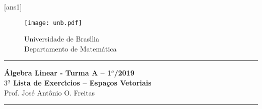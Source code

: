 \documentclass[12pt]{exam}
\newcommand{\vesp}[1]{\vspace{ #1  cm}}
\begin{document}
\pagestyle{empty}

[ans1]

\begin{figure}[h]
        \begin{minipage}[c]{1.7cm}
        \texttt{[image: unb.pdf]}
        \end{minipage}%
        \hspace{0pt}
        \begin{minipage}[c]{4in}
          {Universidade de Bras{\'\i}lia} \\
          {Departamento de Matem{\'a}tica}
\end{minipage}
\end{figure}

\vesp{-0.35} \hrule

\begin{center}
{\Large\bf \'Algebra Linear - Turma A -- 1$^{o}$/2019} \\ \vspace{9pt} {\large\bf
  $3^{\underline{a}}$ Lista de Exerc{\'\i}cios -- Espa\c{c}os Vetoriais}\\ \vspace{9pt} Prof. Jos{\'e} Ant{\^o}nio O. Freitas
\end{center}
\hrule

\vesp{.6}
\end{document}
